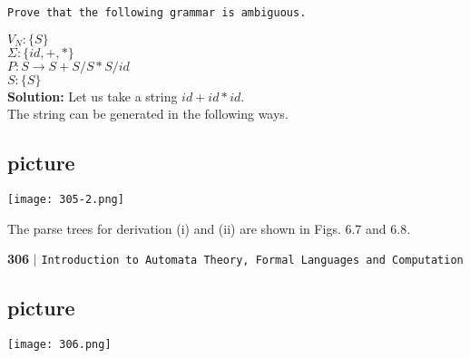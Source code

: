\documentclass{article}
\begin{document}
\hspace*{0.1cm} \texttt{Prove that the following grammar is ambiguous.}

\hspace*{4cm} $V_N: \{S\}$ \\
\hspace*{4cm} $\Sigma: \{id, +, *\}$ \\
\hspace*{4cm} $P: S \rightarrow S + S/S * S/id$ \\
\hspace*{4cm} $S: \{S\}$ \\

\textbf{Solution:} Let us take a string $id + id*id$.\\
The string can be generated in the following ways.\\

\vspace*{0.2cm}
\begin{flushleft}
\section{picture}
\texttt{[image: 305-2.png]}
\end{flushleft}

\vspace*{0.2cm}
\hspace*{0.5cm} The parse trees for derivation (i) and (ii) are shown in Figs. 6.7 and 6.8.\\

\newpage

\begin{flushleft}
    \textbf{306}\hspace*{0.1cm} \textbf{$|$} \hspace*{0.1cm} \texttt{Introduction to Automata Theory, Formal Languages and Computation}
  \end{flushleft}

\vspace*{0.5cm}
\begin{center}
\section{picture}
\texttt{[image: 306.png]}
\end{center}

\vspace*{0.3cm}
\end{document}
